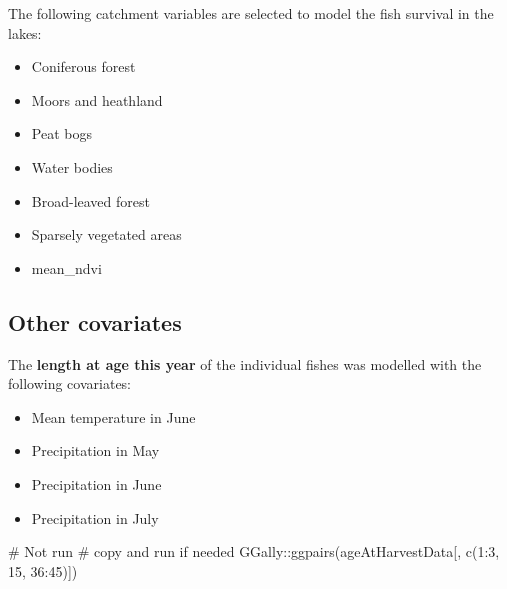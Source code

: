 \documentclass[
]{article}
\newenvironment{Shaded}{\begin{snugshade}}{\end{snugshade}}
\newcommand{\CommentTok}[1]{\textcolor[rgb]{0.37,0.37,0.37}{#1}}
\newcommand{\DecValTok}[1]{\textcolor[rgb]{0.68,0.00,0.00}{#1}}
\newcommand{\FunctionTok}[1]{\textcolor[rgb]{0.28,0.35,0.67}{#1}}
\newcommand{\NormalTok}[1]{\textcolor[rgb]{0.00,0.23,0.31}{#1}}
\newcommand{\SpecialCharTok}[1]{\textcolor[rgb]{0.37,0.37,0.37}{#1}}
\begin{document}
\begin{Shaded}
\end{Shaded}

The following catchment variables are selected to model the fish
survival in the lakes:

\begin{itemize}
\item
  Coniferous forest
\item
  Moors and heathland
\item
  Peat bogs
\item
  Water bodies
\item
  Broad-leaved forest
\item
  Sparsely vegetated areas
\item
  mean\_ndvi
\end{itemize}

\hypertarget{other-covariates}{%
\subsection{Other covariates}\label{other-covariates}}

The \textbf{length at age this year} of the individual fishes was
modelled with the following covariates:

\begin{itemize}
\item
  Mean temperature in June
\item
  Precipitation in May
\item
  Precipitation in June
\item
  Precipitation in July
\end{itemize}

\begin{Shaded}
\begin{Highlighting}[]
\CommentTok{\# Not run}
\CommentTok{\# copy and run if needed}
\NormalTok{GGally}\SpecialCharTok{::}\FunctionTok{ggpairs}\NormalTok{(ageAtHarvestData[, }\FunctionTok{c}\NormalTok{(}\DecValTok{1}\SpecialCharTok{:}\DecValTok{3}\NormalTok{, }\DecValTok{15}\NormalTok{, }\DecValTok{36}\SpecialCharTok{:}\DecValTok{45}\NormalTok{)])}
\end{Highlighting}
\end{Shaded}
\end{document}

